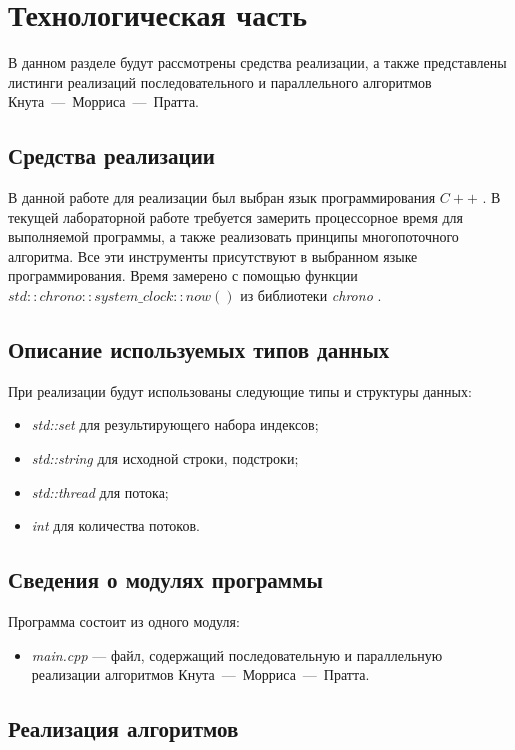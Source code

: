 \chapter{Технологическая часть}

В данном разделе будут рассмотрены средства реализации, а также представлены листинги реализаций последовательного и параллельного алгоритмов Кнута~---~Морриса~---~Пратта.

\section{Средства реализации}

В данной работе для реализации был выбран язык программирования
$C++$ \cite{cpp}. В текущей лабораторной работе требуется замерить процессорное
время для выполняемой программы, а также реализовать принципы многопоточного алгоритма. Все эти инструменты присутствуют в выбранном языке
программирования.
Время замерено с помощью функции $std::chrono::system\_clock::now()$
из библиотеки \textit{chrono} \cite{chrono}.

\section{Описание используемых типов данных}

При реализации будут использованы следующие типы и структуры данных:
\begin{itemize}[label=---]
	\item \textit{std::set} для результирующего набора индексов;
	\item \textit{std::string} для исходной строки, подстроки;
	\item \textit{std::thread} для потока;
	\item \textit{int} для количества потоков. 
\end{itemize}

\section{Сведения о модулях программы}

Программа состоит из одного модуля:
\begin{itemize}[label={---}]
	\item \textit{main.cpp} --- файл, содержащий последовательную и параллельную реализации алгоритмов Кнута~---~Морриса~---~Пратта.
\end{itemize}

\section{Реализация алгоритмов}

